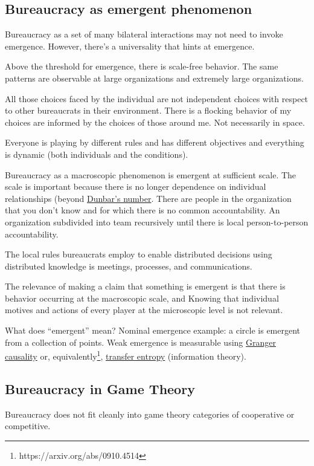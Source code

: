 \subsection{Bureaucracy as emergent phenomenon}
Bureaucracy as a set of many bilateral interactions may not need to invoke emergence. However, there's a universality that hints at emergence. 

Above the threshold for emergence, there is scale-free behavior. The same patterns are observable at large organizations and extremely large organizations.

All those choices faced by the individual are not independent choices with respect to other bureaucrats in their environment. There is a flocking behavior of my choices are informed by the choices of those around me. Not necessarily in space.

Everyone is playing by different rules and has different objectives and everything is dynamic (both individuals and the conditions). 

Bureaucracy as a macroscopic phenomenon is emergent at sufficient scale. The scale is important because there is no longer dependence on individual relationships (beyond \href{https://en.wikipedia.org/wiki/Dunbar\%27s_number}{Dunbar's number}. There are people in the organization that you don't know and for which there is no common accountability. An organization subdivided into team recursively until there is local person-to-person accountability.  

The local rules bureaucrats employ to enable distributed decisions using distributed knowledge is meetings, processes, and communications. 

The relevance of making a claim that something is emergent is that there is behavior occurring at the macroscopic scale, and Knowing that individual motives and actions of every player at the microscopic level is not relevant.

What does ``emergent'' mean? Nominal emergence example: a circle is emergent from a collection of points. Weak emergence is measurable using \href{https://en.wikipedia.org/wiki/Granger_causality}{Granger causality} or, equivalently\footnote{https://arxiv.org/abs/0910.4514}, \href{https://en.wikipedia.org/wiki/Transfer_entropy}{transfer entropy} (information theory). 


\subsection{Bureaucracy in Game Theory}
Bureaucracy does not fit cleanly into game theory categories of cooperative or competitive.

